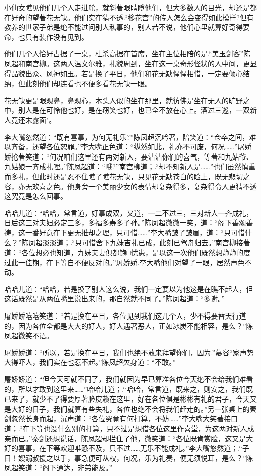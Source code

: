 \documentclass[12pt,oneside]{book}
\begin{document}
小仙女瞧见他们几个人走进舱，就斜著眼睛瞪他们，但大多数人的目光，却还是都在好奇的望著花无缺。他们实在猜不透.``移花宫''的传人怎么会变得如此模样?但有教养的世家子弟是绝不能过问别人私事的，别人若不说，他们心里就算好奇得要命，也只有装作没有见到。

他们几个人恰好占据了一桌，杜杀高据在首席，坐在主位相陪的是.``美玉剑客''陈凤超和南宫柳。这两人温文尔雅，礼貌周到，坐在这一桌奇形怪状的人中间，更显得品貌出众、风神如玉。若是换了平日，他们和花无缺惺惺相惜，一定要倾心结纳，但此刻他们却连看也不便多看花无缺一眼。

花无缺更是眼观鼻，鼻观心，木头人似的坐在那里，就彷佛是坐在无人的旷野之中，别人是在可怜他也好，是在窃笑也好，也已全不放在心上。酒过三巡，一双新人竟还末露面"。

李大嘴忽然道：``既有喜事，为何无礼乐?''陈凤超沉吟著，陪笑道：``仓卒之间，难以齐备，还望各位恕罪。''李大嘴正色道：``纵然如此，礼亦不可废，何况\ldots\ldots{}''屠娇娇抢著笑道：``何况咱们这里还有两对新人，要沾沾你们的喜气，等著和九姑爷、九姑娘一齐成礼哩。''陈凤超道：``哦?''南宫柳道；.``却不知新人是\ldots\ldots{}''也们虽然慎重而多礼，但此时还是忍不住瞧了瞧花无缺，只见花无缺苍白的睑上，既无悲切之容，亦无欢喜之色。他身旁一个美丽少女的表情却复杂得多，复杂得令人更猜不透这究竟是怎么回事。

哈哈儿道：``哈哈，常言道，好事成双，又道，一二不过三，三对新人一齐成礼，日后这三对夫妇必定三多，多福多寿多子孙。''陈凤超微微一笑，道：``阁下善颂善祷，这一番好意在下更无推却之理，只可惜\ldots\ldots{}''李大嘴皱了皱眉，道：``只可惜什么？''陈凤超淡淡道；.``只可惜舍下九妹吉礼已成，此刻已驾舟归去。''南宫柳接著道：``各位想必也知道，九妹夫妻俱都饱□忧患，是以这一次他们既然想静静的度过此一佳期，在下等自不便反对的。''屠娇娇.李大嘴他们对望了一眼，居然声色不动。

哈哈儿道：``哈哈，若是换了别人这么说，我们一定要以为他这是在瞧不起人，但这话既然是从两位嘴里说出来的，那自然就不同了。''陈凤超道：``多谢。''

屠娇娇嘻嘻笑道：``若是换在平日，各位见到我们这几个人，少不得要替天行道的，因为各位全都是大大的好人，好人遇著恶人，正如冰炭不能相容，是么？''陈凤超微笑不语。

屠娇娇道：``所以，若是换在平日，我们也绝不敢来拜望你们，因为.''慕容``家声势大得吓人，我们实在也惹不起。''陈凤超欠身道：``不敢。''

屠娇娇道：``但今天可就不同了，我们就因为早已算准各位今天绝不会给我们难看的，所以才敢到这里来\ldots\ldots{}''哈哈儿道；.``哈哈，常言道，既来之，则安之，我们既已来了，就少不了得要厚著脸皮赖在这里，好在各位俱是彬彬有礼的君子，今天又是大好的日子，我们就算有些失礼，各位也绝不会将我们赶走的。''另一张桌上的秦剑忽然长身而起，沉声道：``各位究竟有何打算，不妨\ldots\ldots{}''李大嘴大笑著接口道；.``在下等也没什么别的打算，只不过是想借各位这里作喜堂，为这两对新人成亲而已。''秦剑还想说话，陈凤超却拦住了他，微笑道：``各位既肯赏脸，这又是大好的喜事，在下等欢迎唯恐不及，只不过\ldots\ldots 无乐不能成礼。''李大嘴悠然道；.``子日！嫂溺叔援之以手，事急便可从权，何况，乐为礼奏，便无须悦耳，是么？''陈凤超笑道：``阁下通达，非弟能及。''
\end{document}

